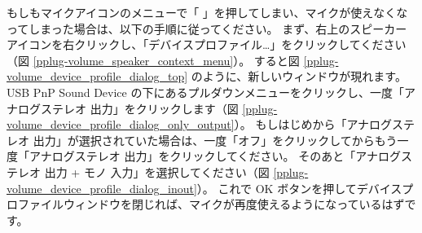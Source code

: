 \documentclass[text06.tex]{subfiles}
\begin{document}
もしもマイクアイコンのメニューで「   」を押してしまい、マイクが使えなくなってしまった場合は、以下の手順に従ってください。
まず、右上のスピーカーアイコンを右クリックし、「デバイスプロファイル…」をクリックしてください（図 \ref{pplug-volume_speaker_context_menu}）。
すると図 \ref{pplug-volume_device_profile_dialog_top} のように、新しいウィンドウが現れます。
USB PnP Sound Device の下にあるプルダウンメニューをクリックし、一度「アナログステレオ 出力」をクリックします（図 \ref{pplug-volume_device_profile_dialog_only_output}）。
もしはじめから「アナログステレオ 出力」が選択されていた場合は、一度「オフ」をクリックしてからもう一度「アナログステレオ 出力」をクリックしてください。
そのあと「アナログステレオ 出力 + モノ 入力」を選択してください（図 \ref{pplug-volume_device_profile_dialog_inout}）。
これで OK ボタンを押してデバイスプロファイルウィンドウを閉じれば、マイクが再度使えるようになっているはずです。
\end{document}
